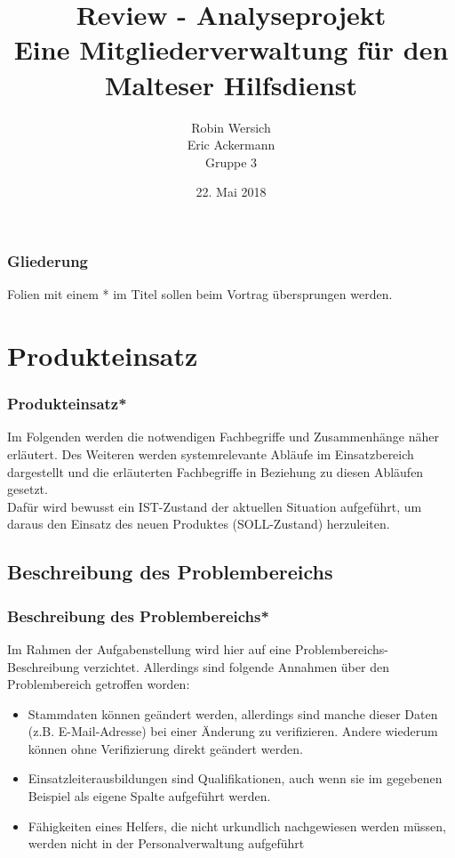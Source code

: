 \documentclass{beamer}
\begin{document}
			
	
	\title[Review - Analyseprojekt]{Review - Analyseprojekt\\ Eine Mitgliederverwaltung für den Malteser Hilfsdienst}
	\author[Robin Wersich\\Eric Ackermann]{Robin Wersich\\Eric Ackermann\\ Gruppe 3}
	
	 \begin{frame}[title=Hauptgebaeude_Nacht.jpg]
	 \maketitle
	 \date{22. Mai 2018}
 	\end{frame}
	 
	\begin{frame}
		\frametitle{Gliederung}
		\tableofcontents
		Folien mit einem * im Titel sollen beim Vortrag übersprungen werden.
	\end{frame}

\section{Produkteinsatz}		
\begin{frame}
\frametitle{Produkteinsatz*}
Im Folgenden werden die notwendigen Fachbegriffe und Zusammenhänge näher erläutert. Des Weiteren werden systemrelevante Abläufe im Einsatzbereich dargestellt und die erläuterten Fachbegriffe in Beziehung zu diesen Abläufen gesetzt.\\
Dafür wird bewusst ein IST-Zustand der aktuellen Situation aufgeführt, um daraus den Einsatz des neuen Produktes (SOLL-Zustand) herzuleiten.
\end{frame}

\subsection{Beschreibung des Problembereichs}		
\begin{frame}
\frametitle{Beschreibung des Problembereichs*}
Im Rahmen der Aufgabenstellung wird hier auf eine Problembereichs-Beschreibung verzichtet. Allerdings sind folgende Annahmen über den Problembereich getroffen worden:
\begin{itemize}
\item Stammdaten können geändert werden, allerdings sind manche dieser Daten (z.B. E-Mail-Adresse) bei einer Änderung zu verifizieren. Andere wiederum können ohne Verifizierung direkt geändert werden.
\item Einsatzleiterausbildungen sind Qualifikationen, auch wenn sie im gegebenen Beispiel als eigene Spalte aufgeführt werden.
\item Fähigkeiten eines Helfers, die nicht urkundlich nachgewiesen werden müssen, werden nicht in der Personalverwaltung aufgeführt
\end{itemize}
\end{frame}
\end{document}
